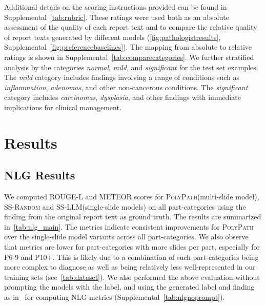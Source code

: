 \documentclass[11pt]{article}
\newcommand{\ourmodel}{\textsc{PolyPath}\xspace}
\newcommand{\randommodel}{\textsc{SS-Random}\xspace}
\newcommand{\llmmodel}{\textsc{SS-LLM}\xspace}
\begin{document}
Additional details on the scoring instructions provided can be found in Supplemental~\autoref{tab:rubric}. These ratings were used both as an absolute assessment of the quality of each report text and to compare the relative quality of report texts generated by different models (\autoref{fig:pathologistresults}, Supplemental~\autoref{fig:preferencebaselines}). The mapping from absolute to relative ratings is shown in Supplemental~\autoref{tab:comparecategories}. We further stratified analysis by the categories \emph{normal}, \emph{mild}, and \emph{significant} for the test set examples. The \emph{mild} category includes findings involving a range of conditions such as \emph{inflammation}, \emph{adenomas}, and other non-cancerous conditions. The \emph{significant} category includes \emph{carcinomas}, \emph{dysplasia}, and other findings with immediate implications for clinical management.


\section{Results}
\subsection{NLG Results}
\label{sec:nlg_evals}
We computed ROUGE-L and METEOR scores for \ourmodel (multi-slide model), \randommodel and \llmmodel (single-slide models) on all part-categories using the finding from the original report text as ground truth. The results are summarized in~\autoref{tab:nlg_main}. The metrics indicate consistent improvements for \ourmodel over the single-slide model variants across all part-categories. We also observe that metrics are lower for part-categories with more slides per part, especially for P6-9 and P10+. This is likely due to a combination of such part-categories being more complex to diagnose as well as being relatively less well-represented in our training sets (see~\autoref{tab:dataset}). We also performed the above evaluation without prompting the models with the label, and using the generated label and finding as in~\citet{ahmed2024pathalign} for computing NLG metrics (Supplemental~\autoref{tab:nlgnoprompt}).
\end{document}
